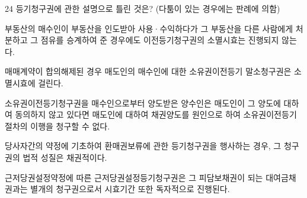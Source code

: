 \begin{question}{24}
등기청구권에 관한 설명으로 틀린 것은? (다툼이 있는 경우에는 판례에 의함)
\begin{choices}
  \item 부동산의 매수인이 부동산을 인도받아 사용·수익하다가 그 부동산을 다른 사람에게 처분하고 그 점유를 승계하여 준 경우에도 이전등기청구권의 소멸시효는 진행되지 않는다.
  \item 매매계약이 합의해제된 경우 매도인의 매수인에 대한 소유권이전등기 말소청구권은 소멸시효에 걸린다.
  \item 소유권이전등기청구권을 매수인으로부터 양도받은 양수인은 매도인이 그 양도에 대하여 동의하지 않고 있다면 매도인에 대하여 채권양도를 원인으로 하여 소유권이전등기절차의 이행을 청구할 수 없다.
  \item 당사자간의 약정에 기초하여 환매권보류에 관한 등기청구권을 행사하는 경우, 그 청구권의 법적 성질은 채권적이다.
  \item 근저당권설정약정에 따른 근저당권설정등기청구권은 그 피담보채권이 되는 대여금채권과는 별개의 청구권으로서 시효기간 또한 독자적으로 진행된다.
\end{choices}
\end{question}
